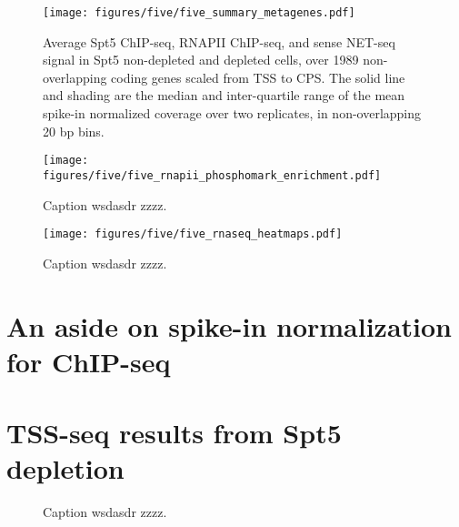 \lipsum

\begin{wrapfigure}[14]{r}{3in}
    \texttt{[image: figures/five/five\_summary\_metagenes.pdf]}
    \caption[Average Spt5 ChIP-seq, RNAPII ChIP-seq, and sense NET-seq signal over non-overlapping coding genes, from Spt5 depleted and non-depleted cells.]{Average Spt5 ChIP-seq, RNAPII ChIP-seq, and sense NET-seq signal in Spt5 non-depleted and depleted cells, over 1989 non-overlapping coding genes scaled from TSS to CPS. The solid line and shading are the median and inter-quartile range of the mean spike-in normalized coverage over two replicates, in non-overlapping 20 bp bins.}
    \label{fig:five_suummary_metagenes}
\end{wrapfigure}

\lipsum[2]

\begin{wrapfigure}[6]{r}{4.5in}
    \texttt{[image: figures/five/five\_rnapii\_phosphomark\_enrichment.pdf]}
    \caption[Enrichment of RNAPII phospho-serine 5 and phospho-serine 2 over non-overlapping coding genes, in Spt5 depleted and non-depleted cells.]{Caption wsdasdr zzzz.}
    \label{fig:five_rnapii_phosphomark_enrichment}
\end{wrapfigure}

\begin{figure}
    \texttt{[image: figures/five/five\_rnaseq\_heatmaps.pdf]}
    \caption[Heatmaps of antisense RNA-seq signal from Spt5 depleted and non-depleted cells, over non-overlapping coding genes.]{Caption wsdasdr zzzz.}
    \label{fig:five_rnaseq_heatmaps}
\end{figure}

\section{An aside on spike-in normalization for ChIP-seq}

\section{TSS-seq results from Spt5 depletion}

\begin{figure}
\caption[Bar plot of the number of TSS-seq peaks of various genomic classes differentially expressed in Spt5 depleted versus non-depleted cells.]{Caption wsdasdr zzzz.}
\end{figure}


